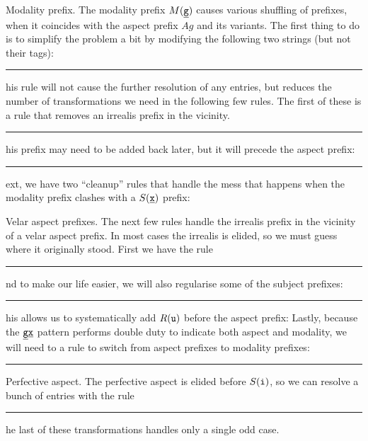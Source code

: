\medskip\boldlabel Modality prefix. The modality prefix $\M{\g}$ causes various shuffling of prefixes, when it
coincides with the aspect prefix $A{g}$ and its variants. The first thing to do is to simplify the problem a bit
by modifying the following two strings (but not their tags):
\rule{$\M{\x}\to \M{\g}, \A{k}\M{\g}\to \A{g}\M{\g}$}
This rule will not cause the further resolution of any entries, but reduces the number of transformations we need
in the following few rules. The first of these is a rule that removes an irrealis prefix in the vicinity.
\rule{$\A{g}\M{\g}\R{w}\to \A{g}\M{\g}, \A{g}\R{w}\M{\g} \to \A{g}\M{\g}$}
This prefix may need to be added back later, but it will precede the aspect prefix:
\rule{$\A{g}\M{\g}\to \R{w}\A{g}\M{\g}, \A{\g}\M{\g}\to \R{w}\A{\g}\M{\g}$}
Next, we have two ``cleanup'' rules that handle the mess that happens when the modality prefix clashes with
a $\S{\x}$ prefix:

\medskip\boldlabel Velar aspect prefixes. The next few rules handle the irrealis prefix in the vicinity of
a velar aspect prefix. In most cases the irrealis is elided, so we must guess where it originally stood.
First we have the rule
\rule{$\A{g}\R{o}\to \R{u}\A{g}$,}
and to make our life easier, we will also regularise some of the subject prefixes:
\rule{$\S{y}\to \S{i}, \S{ee}\to \S{i}, \S{yee}\to\S{yi}, \S{ye}\to\S{yi}, \S{too}\to\S{tu}, \S{\k}\to
\A{\g}\S{\x}$}
This allows us to systematically add $\R{u}$ before the aspect prefix:
Lastly, because the $\tt \g\x$ pattern performs double duty to indicate both aspect and modality, we will need
to a rule to switch from aspect prefixes to modality prefixes:
\rule{$\A{\g}\S{\x}\to \M{\g}\S{\x}$}

\medbreak\boldlabel Perfective aspect. The perfective aspect is elided before $\S{i}$,
so we can resolve a bunch of entries
with the rule
\rule{$\Q{a}\S{i}\to \Q{a}\A{wu}\S{i}, \Q{ka}\S{i}\to \Q{ka}\A{wu}\S{i},\Q{\x'a}\S{i}\to \Q{\x'e}\A{wu}\S{i},$
\tinyskip
$\Q{ji}\S{i}\to \Q{ji}\A{wu}\S{i}, \Q{tu}\S{i}\to \Q{tu}\A{wu}\S{i},\A{e}\S{e}\to \Q{a}\A{wu}\S{i}$.}
The last of these transformations handles only a single odd case.

